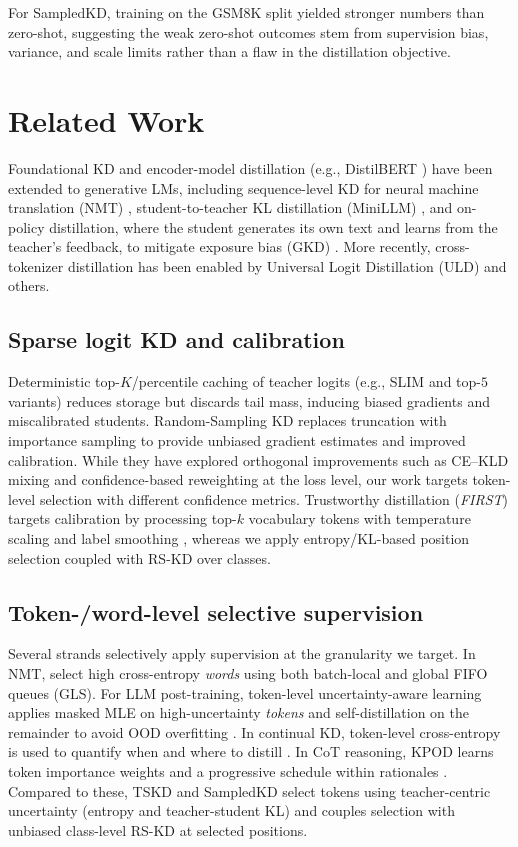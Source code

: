 \documentclass[11pt]{article}
\begin{document}
For SampledKD, training on the GSM8K split yielded stronger numbers than zero-shot, suggesting the weak zero-shot outcomes stem from supervision bias, variance, and scale limits rather than a flaw in the distillation objective.

\section{Related Work}

Foundational KD \citep{hinton2015distillation} and encoder-model distillation (e.g., DistilBERT \citep{sanh2019distilbert}) have been extended to generative LMs, including sequence-level KD for neural machine translation (NMT) \citep{kim2016sequencekd}, student-to-teacher KL distillation (MiniLLM) \citep{gu2023minillm}, and on-policy distillation, where the student generates its own text and learns from the teacher's feedback, to mitigate exposure bias (GKD) \citep{agarwal2024gkd}.
More recently, cross-tokenizer distillation has been enabled by Universal Logit Distillation (ULD) \citep{boizard2024uld} and others.

\subsection{Sparse logit KD and calibration}
Deterministic top-$K$/percentile caching of teacher logits (e.g., SLIM \citep{raman2023slim} and top-$5$ variants) reduces storage but discards tail mass, inducing biased gradients and miscalibrated students.
Random-Sampling KD \citep{anshumann2025sparse} replaces truncation with importance sampling to provide unbiased gradient estimates and improved calibration.
While they have explored orthogonal improvements such as CE--KLD mixing and confidence-based reweighting at the loss level, our work targets token-level selection with different confidence metrics.
Trustworthy distillation (\emph{FIRST}) targets calibration by processing top-$k$ vocabulary tokens with temperature scaling and label smoothing \citep{shum2024first}, whereas we apply entropy/KL-based position selection coupled with RS-KD over classes.

\subsection{Token-/word-level selective supervision} Several strands selectively apply supervision at the granularity we target. In NMT, \citet{wang2021selectivekd} select high cross-entropy \emph{words} using both batch-local and global FIFO queues (GLS). For LLM post-training, token-level uncertainty-aware learning applies masked MLE on high-uncertainty \emph{tokens} and self-distillation on the remainder to avoid OOD overfitting \citep{liu2025tokenlevel}. In continual KD, token-level cross-entropy is used to quantify when and where to distill \citep{zhang2023continualkd}. In CoT reasoning, KPOD learns token importance weights and a progressive schedule within rationales \citep{feng2024kpod}.
Compared to these, TSKD and SampledKD select tokens using teacher-centric uncertainty (entropy and teacher-student KL) and couples selection with unbiased class-level RS-KD at selected positions.
\end{document}
